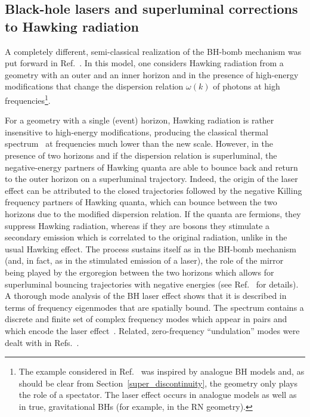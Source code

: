 \documentclass[11pt]{article}
\numberwithin{equation}{section} %
\begin{document}
\subsection{Black-hole lasers and superluminal corrections to Hawking radiation}\label{sec:BHlasers}

A completely different, semi-classical realization of the BH-bomb mechanism was put forward in Ref.~\cite{Corley:1998rk}. In this model, one considers Hawking radiation from a geometry with an outer and an inner horizon and in the presence of high-energy modifications that change the dispersion relation $\omega(k)$ of photons at high frequencies\footnote{The example considered in Ref.~\cite{Corley:1998rk} was inspired by analogue
BH models and, as should be clear from Section~\ref{super_discontinuity}, the geometry only plays the role of a spectator. The laser effect occurs in analogue models as well as in true, gravitational BHs (for example, in the RN geometry).}. 

For a geometry with a single (event) horizon, Hawking radiation is rather insensitive to high-energy modifications, producing the classical thermal spectrum~\cite{Hawking:1974sw} at frequencies much lower than the new scale. However, in the presence of two horizons and if the dispersion relation is superluminal, the negative-energy partners of Hawking quanta are able to bounce back and return to the outer horizon on a superluminal trajectory.
Indeed, the origin of the laser effect can be attributed to the closed trajectories followed by the negative Killing frequency partners of Hawking quanta, which can bounce between the two horizons due to the modified dispersion relation.
If the quanta are fermions, they suppress Hawking radiation, whereas if they are bosons they stimulate a secondary emission which is correlated to the original radiation, unlike in the usual Hawking effect. The process sustains itself as in the BH-bomb mechanism (and, in fact, as in the stimulated emission of a laser), the role of the mirror being played by the ergoregion between the two horizons which allows for superluminal bouncing trajectories with negative energies (see Ref.~\cite{Corley:1998rk} for details). 
A thorough mode analysis of the BH laser effect shows that
it is described in terms of frequency eigenmodes that are spatially bound. The spectrum contains a discrete and finite
set of complex frequency modes which appear in pairs and which encode the laser effect~\cite{Coutant:2009cu,Coutant:2014wga}. 
Related, zero-frequency ``undulation'' modes were dealt with in Refs.~\cite{Coutant:2012zh,Coutant:2012mf}.
\end{document}
